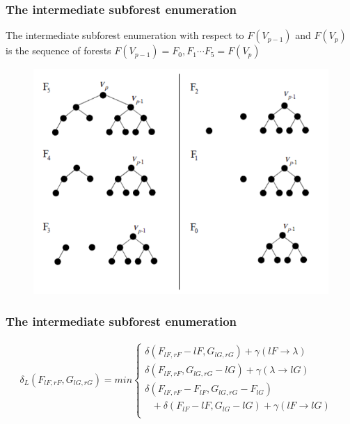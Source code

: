 \documentclass{beamer}
\begin{document}
\begin{frame}
\frametitle{The intermediate subforest enumeration}
The intermediate subforest enumeration with respect to $F(V_{p-1})$ and $F(V_p)$ is the sequence of forests $F(V_{p-1}) = F_0, F_1 \cdots F_5 = F(V_p)$
\begin{figure}
	\includegraphics[width=0.8\linewidth]{PathDecomposition}
	\label{PathDecomposition} 
	\centering
\end{figure}

\end{frame}

\begin{frame}
\frametitle{The intermediate subforest enumeration} 
\begin{align*}
&\delta_{L}(F_{lF, rF}, G_{lG, rG}) = min \begin{cases}
	  \delta(F_{lF, rF} - lF , G_{lG, rG}) + \gamma(lF \to \lambda) \\ %
      \delta(F_{lF, rF}, G_{lG, rG} - lG) + \gamma(\lambda \to lG) \\ %
     \delta(F_{lF, rF} - F_{lF}, G_{lG, rG} - F_{lG}) 
     \\ \ \ \ + \delta(F_{lF} - lF, G_{lG} - lG) + \gamma(lF \to lG) & \\ %
      \end{cases} &
\end{align*}

\end{frame}
\end{document}
